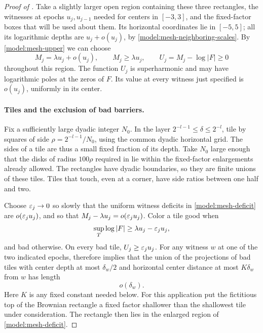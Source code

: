 \begin{proof}[Proof of ]
Take a slightly larger open region containing these three rectangles,
the witnesses at epochs \(u_j,u_{j-1}\) needed for centers in
\([-3,3]\), and the fixed-factor boxes that will be used about them.
Its horizontal coordinates lie in
\([-5,5]\); all its logarithmic depths are
\(u_j+o(u_j)\), by \eqref{model:mesh-neighboring-scales}.  By
\eqref{model:mesh-upper} we can choose
\begin{equation}
 M_j=\lambda u_j+o(u_j),\qquad M_j\ge\lambda u_j,
 \qquad U_j=M_j-\log|F|\ge0
 \label{model:mesh-deficit}
\end{equation}
throughout this region.  The function \(U_j\) is superharmonic and may
have logarithmic poles at the zeros of \(F\).  Its value at every
witness just specified is \(o(u_j)\), uniformly in its center.

\paragraph{Tiles and the exclusion of bad barriers.}
Fix a sufficiently large dyadic integer \(N_0\).  In the layer
\(2^{-l-1}\le\delta\le2^{-l}\), tile by squares of side
\(\rho=2^{-l-1}/N_0\), using the common dyadic horizontal grid.
The sides of a tile are thus a small fixed fraction of its depth.
Take \(N_0\) large enough that the disks of radius \(100\rho\)
required in  lie within the fixed-factor
enlargements already allowed.  The rectangles have dyadic boundaries,
so they are finite unions of these tiles.  Tiles that touch, even at a
corner, have side ratios between one half and two.

Choose \(\varepsilon_j\to0\) so slowly that the uniform witness deficits in
\eqref{model:mesh-deficit} are \(o(\varepsilon_j u_j)\), and so that
\(M_j-\lambda u_j=o(\varepsilon_j u_j)\).  Color a tile good when
\begin{equation}
 \sup_T\log|F|\ge\lambda u_j-\varepsilon_j u_j,
 \label{model:mesh-good-tile}
\end{equation}
and bad otherwise.  On every bad tile, \(U_j\ge\varepsilon_j u_j\).
For any witness \(w\) at one of the two indicated epochs,
 therefore implies that the union of the
projections of bad tiles with center depth at most \(\delta_w/2\)
and horizontal center distance at most \(K\delta_w\) from \(w\)
has length
\begin{equation}
 o(\delta_w).
 \label{model:mesh-small-bad-shadow}
\end{equation}
Here \(K\) is any fixed constant needed below.  For this application
put the fictitious top of the Brownian rectangle a fixed factor
shallower than the shallowest tile under consideration.  The rectangle
then lies in the enlarged region of \eqref{model:mesh-deficit}.


\end{proof}
